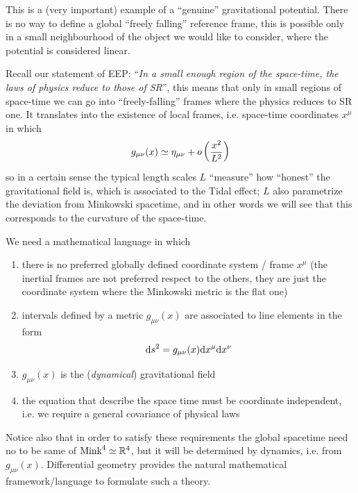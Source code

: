 \documentclass[../main/main.tex]{subfiles}
\begin{document}
\noindent This is a (very important) example of a ``genuine'' gravitational potential. There is no way to define a global ``freely falling'' reference frame, this is possible only in a small neighbourhood of the object we would like to consider, where the potential is considered linear.

Recall our statement of EEP: ``\emph{In a small enough region of the space-time, the laws of physics reduce to those of SR}'', this means that only in small regions of space-time we can go into ``freely-falling'' frames where the physics reduces to SR one. 
It translates into the existence of local frames, i.e. space-time coordinates $x^\mu$ in which 
\[g_{\mu\nu}(x)\simeq \eta_{\mu\nu}+o\left(\frac{x^2}{L^2}\right)\]
so in a certain sense the typical length scales $L$ ``measure'' how ``honest'' the gravitational field is, which is associated to the Tidal effect; $L$ also parametrize the deviation from Minkowski spacetime, and in other words we will see that this corresponds to the curvature of the space-time. 

We need a mathematical language in which
\begin{enumerate}[label=\textbullet]
\item there is no preferred globally defined coordinate system / frame $x^\mu$ (the inertial frames are not preferred respect to the others, they are just the coordinate system where the Minkowski metric is the flat one)
\item intervals defined by a metric $g_{\mu\nu}(x)$ are associated to line elements in the form
\[\textup{d} s^2=g_{\mu\nu}(x)\textup{d} x^\mu\textup{d} x^\nu\]
\item $g_{\mu\nu}(x)$ is the (\emph{dynamical}) gravitational field
\item the equation that describe the space time must be coordinate independent, i.e. we require a general covariance of physical laws
\end{enumerate}
Notice also that in order to satisfy these requirements the global spacetime need no to be same of $\text{Mink}^4\simeq\mathbb{R}^4$, but it will be determined by dynamics, i.e. from $g_{\mu\nu}(x)$. 
Differential geometry provides the natural mathematical framework/language to formulate such a theory.  
\end{document}
